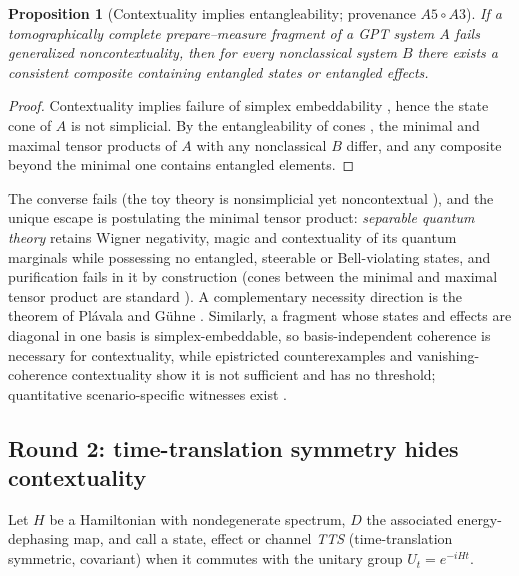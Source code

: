 \documentclass[11pt,a4paper]{article}
\newtheorem{proposition}{Proposition}
\theoremstyle{definition}
\begin{document}
\begin{proposition}[Contextuality implies entangleability; provenance
$A5\circ A3$]\label{prop:p1}
If a tomographically complete prepare--measure fragment of a GPT system $A$
fails generalized noncontextuality, then for every nonclassical system $B$
there exists a consistent composite containing entangled states or entangled
effects.
\end{proposition}
\begin{proof}
Contextuality implies failure of simplex embeddability \cite{schmid2021},
hence the state cone of $A$ is not simplicial. By the entangleability of cones
\cite{aubrun2021,aubrun2022}, the minimal and maximal tensor products of $A$
with any nonclassical $B$ differ, and any composite beyond the minimal one
contains entangled elements.
\end{proof}

The converse fails (the toy theory is nonsimplicial yet noncontextual
\cite{spekkens2007,schmid2021}), and the unique escape is postulating the
minimal tensor product: \emph{separable quantum theory} retains Wigner
negativity, magic and contextuality of its quantum marginals while possessing
no entangled, steerable or Bell-violating states, and purification
\cite{cdp2010} fails in it by construction (cones between the minimal and
maximal tensor product are standard \cite{janotta2014}). A complementary
necessity direction is the theorem of Pl\'avala and G\"uhne \cite{plavala2024}.
Similarly, a fragment whose states and effects are diagonal in one basis is
simplex-embeddable, so basis-independent coherence is necessary for
contextuality, while epistricted counterexamples
\cite{spekkens2007,catani2023} and vanishing-coherence contextuality
\cite{rossi2023} show it is not sufficient and has no threshold; quantitative
scenario-specific witnesses exist \cite{wagner2024}.

\subsection{Round 2: time-translation symmetry hides contextuality}

Let $H$ be a Hamiltonian with nondegenerate spectrum, $D$ the associated
energy-dephasing map, and call a state, effect or channel \emph{TTS}
(time-translation symmetric, covariant) when it commutes with the unitary
group $U_t=e^{-iHt}$.
\end{document}
